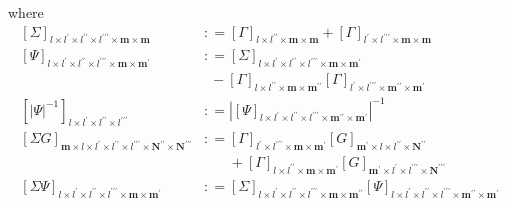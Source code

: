 \documentclass[preprint,12pt]{elsarticle}
\newcommand*{\M}[1]{\ensuremath{#1}\xspace}
\newcommand*{\x}{\times}
\newcommand*{\mi}[1]{\mathbf{#1}}
\newcommand*{\te}[2][]{\left\lbrack{#2}\right\rbrack_{#1}}
\newcommand*{\deq}{\M{\mathrel{\mathop:}=}}
\newcommand*{\modulus}[1]{\M{\left\lvert{#1}\right\rvert}}
\begin{document}
        where
        \begin{equation*}
            \begin{aligned}
                \te[l\x l^{\prime}\x l^{\prime\prime}\x l^{\prime\prime\prime}\x\mi{m}\x\mi{m}]{\Sigma} &\deq 
                \te[l\x l^{\prime\prime}\x\mi{m}\x\mi{m}]{\Gamma} + \te[l^{\prime}\x l^{\prime\prime\prime}\x\mi{m}\x\mi{m}]{\Gamma} \\
                \te[l\x l^{\prime}\x l^{\prime\prime}\x l^{\prime\prime\prime}\x\mi{m}\x\mi{m^{\prime}}]{\Psi} &\deq 
                \te[l\x l^{\prime}\x l^{\prime\prime}\x l^{\prime\prime\prime}\x\mi{m}\x\mi{m^{\prime}}]{\Sigma} \\
                &\phantom{:}- \te[l\x l^{\prime\prime}\x\mi{m}\x\mi{m^{\prime\prime}}]{\Gamma} \te[l^{\prime}\x l^{\prime\prime\prime}\x\mi{m^{\prime\prime}}\x\mi{m^{\prime}}]{\Gamma} \\
                \te[l\x l^{\prime}\x l^{\prime\prime}\x l^{\prime\prime\prime}]{\modulus{\Psi}^{-1}} &\deq 
                \modulus{\te[l\x l^{\prime}\x l^{\prime\prime}\x l^{\prime\prime\prime}\x\mi{m^{\prime\prime}}\x\mi{m^{\prime}}]{\Psi}}^{-1} \\
                \te[\mi{m}\x l\x l^{\prime}\x l^{\prime\prime}\x l^{\prime\prime\prime}\x\mi{N^{\prime\prime}}\x\mi{N^{\prime\prime\prime}}]{\Sigma G} &\deq 
                \te[l^{\prime}\x l^{\prime\prime\prime}\x\mi{m}\x\mi{m^{\prime}}]{\Gamma}
                \te[\mi{m^{\prime}}\x l\x l^{\prime\prime}\x\mi{N^{\prime\prime}}]{G}\\
                &\phantom{\deq}+
                \te[l\x l^{\prime\prime}\x\mi{m}\x\mi{m^{\prime}}]{\Gamma}
                \te[\mi{m^{\prime}}\x l^{\prime}\x l^{\prime\prime\prime}\x\mi{N^{\prime\prime\prime}}]{G}\\
                \te[l\x l^{\prime}\x l^{\prime\prime}\x l^{\prime\prime\prime}\x\mi{m}\x\mi{m^{\prime}}]{\Sigma\Psi} &\deq 
                \te[l\x l^{\prime}\x l^{\prime\prime}\x l^{\prime\prime\prime}\x\mi{m}\x\mi{m^{\prime\prime}}]{\Sigma}
                \te[l\x l^{\prime}\x l^{\prime\prime}\x l^{\prime\prime\prime}\x\mi{m^{\prime\prime}}\x\mi{m^{\prime}}]{\Psi}
            \end{aligned}                    
        \end{equation*}
\end{document}
